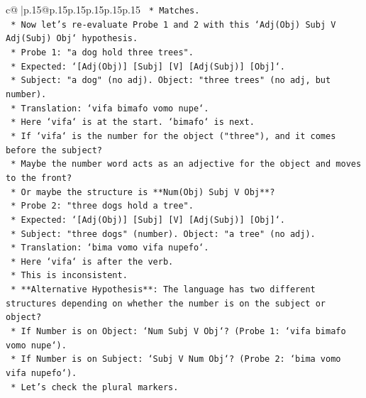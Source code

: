 \documentclass{article}
\begin{document}
{\begin{supertabular}{c@{$\;$}|p{.15\linewidth}@{}p{.15\linewidth}p{.15\linewidth}p{.15\linewidth}p{.15\linewidth}p{.15\linewidth}}
{{{\texttt{                    *   Matches.} \\
\texttt{            *   Now let's re{-}evaluate Probe 1 and 2 with this `Adj(Obj) Subj V Adj(Subj) Obj` hypothesis.} \\
\texttt{                *   Probe 1: "a dog hold three trees".} \\
\texttt{                    *   Expected: `{[}Adj(Obj){]} {[}Subj{]} {[}V{]} {[}Adj(Subj){]} {[}Obj{]}`.} \\
\texttt{                    *   Subject: "a dog" (no adj). Object: "three trees" (no adj, but number).} \\
\texttt{                    *   Translation: `vifa bimafo vomo nupe`.} \\
\texttt{                    *   Here `vifa` is at the start. `bimafo` is next.} \\
\texttt{                    *   If `vifa` is the number for the object ("three"), and it comes before the subject?} \\
\texttt{                    *   Maybe the number word acts as an adjective for the object and moves to the front?} \\
\texttt{                    *   Or maybe the structure is **Num(Obj) Subj V Obj**?} \\
\texttt{                *   Probe 2: "three dogs hold a tree".} \\
\texttt{                    *   Expected: `{[}Adj(Obj){]} {[}Subj{]} {[}V{]} {[}Adj(Subj){]} {[}Obj{]}`.} \\
\texttt{                    *   Subject: "three dogs" (number). Object: "a tree" (no adj).} \\
\texttt{                    *   Translation: `bima vomo vifa nupefo`.} \\
\texttt{                    *   Here `vifa` is after the verb.} \\
\texttt{                    *   This is inconsistent.} \\
\texttt{            *   **Alternative Hypothesis**: The language has two different structures depending on whether the number is on the subject or object?} \\
\texttt{                *   If Number is on Object: `Num Subj V Obj`? (Probe 1: `vifa bimafo vomo nupe`).} \\
\texttt{                *   If Number is on Subject: `Subj V Num Obj`? (Probe 2: `bima vomo vifa nupefo`).} \\
\texttt{                *   Let's check the plural markers.} \\
}}}
\end{supertabular}}
\end{document}
